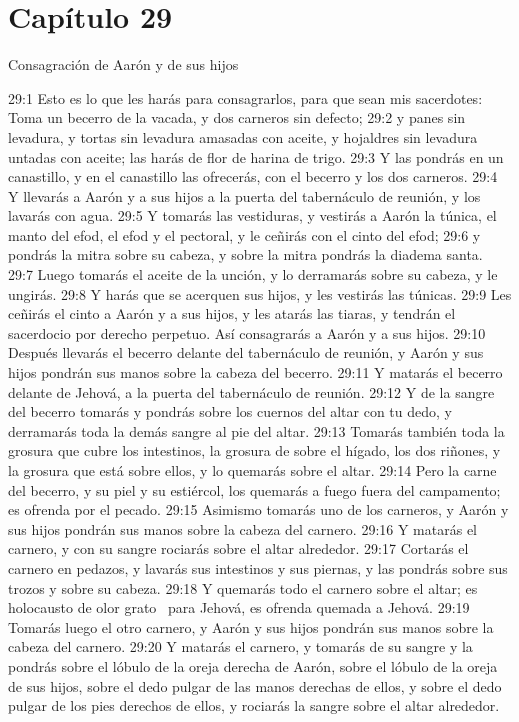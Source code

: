 \section*{Capítulo 29}
Consagración de Aarón y de sus hijos 


29:1 Esto es lo que les harás para consagrarlos, para que sean mis sacerdotes: Toma un becerro de la vacada, y dos carneros sin defecto; 
29:2 y panes sin levadura, y tortas sin levadura amasadas con aceite, y hojaldres sin levadura untadas con aceite; las harás de flor de harina de trigo. 
29:3 Y las pondrás en un canastillo, y en el canastillo las ofrecerás, con el becerro y los dos carneros. 
29:4 Y llevarás a Aarón y a sus hijos a la puerta del tabernáculo de reunión, y los lavarás con agua. 
29:5 Y tomarás las vestiduras, y vestirás a Aarón la túnica, el manto del efod, el efod y el pectoral, y le ceñirás con el cinto del efod; 
29:6 y pondrás la mitra sobre su cabeza, y sobre la mitra pondrás la diadema santa. 
29:7 Luego tomarás el aceite de la unción, y lo derramarás sobre su cabeza, y le ungirás. 
29:8 Y harás que se acerquen sus hijos, y les vestirás las túnicas. 
29:9 Les ceñirás el cinto a Aarón y a sus hijos, y les atarás las tiaras, y tendrán el sacerdocio por derecho perpetuo. Así consagrarás a Aarón y a sus hijos. 
29:10 Después llevarás el becerro delante del tabernáculo de reunión, y Aarón y sus hijos pondrán sus manos sobre la cabeza del becerro. 
29:11 Y matarás el becerro delante de Jehová, a la puerta del tabernáculo de reunión. 
29:12 Y de la sangre del becerro tomarás y pondrás sobre los cuernos del altar con tu dedo, y derramarás toda la demás sangre al pie del altar. 
29:13 Tomarás también toda la grosura que cubre los intestinos, la grosura de sobre el hígado, los dos riñones, y la grosura que está sobre ellos, y lo quemarás sobre el altar. 
29:14 Pero la carne del becerro, y su piel y su estiércol, los quemarás a fuego fuera del campamento; es ofrenda por el pecado. 
29:15 Asimismo tomarás uno de los carneros, y Aarón y sus hijos pondrán sus manos sobre la cabeza del carnero. 
29:16 Y matarás el carnero, y con su sangre rociarás sobre el altar alrededor. 
29:17 Cortarás el carnero en pedazos, y lavarás sus intestinos y sus piernas, y las pondrás sobre sus trozos y sobre su cabeza. 
29:18 Y quemarás todo el carnero sobre el altar; es holocausto de olor grato  para Jehová, es ofrenda quemada a Jehová. 
29:19 Tomarás luego el otro carnero, y Aarón y sus hijos pondrán sus manos sobre la cabeza del carnero. 
29:20 Y matarás el carnero, y tomarás de su sangre y la pondrás sobre el lóbulo de la oreja derecha de Aarón, sobre el lóbulo de la oreja de sus hijos, sobre el dedo pulgar de las manos derechas de ellos, y sobre el dedo pulgar de los pies derechos de ellos, y rociarás la sangre sobre el altar alrededor. 
